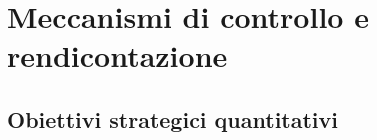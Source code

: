 \section{Meccanismi di controllo e rendicontazione}
\subsection{Obiettivi strategici quantitativi}

